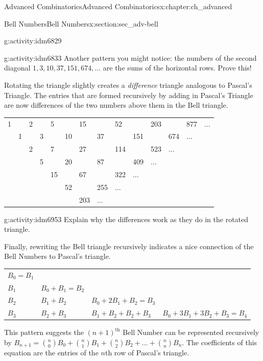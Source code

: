 \documentclass[oneside,10pt,]{book}
\numberwithin{equation}{chapter}
\begin{document}
\begin{chapterptx}{Advanced Combinatorics}{}{Advanced Combinatorics}{}{}{x:chapter:ch_advanced}
\begin{sectionptx}{Bell Numbers}{}{Bell Numbers}{}{}{x:section:sec_adv-bell}
\begin{activity}{}{g:activity:idm6829}
\end{activity}
\begin{activity}{}{g:activity:idm6833}%
Another pattern you might notice: the numbers of the second diagonal \(1, 3, 10, 37, 151, 674, \ldots\) are the sums of the horizontal rows.  Prove this!%
\end{activity}
Rotating the triangle slightly creates a \emph{difference} triangle analogous to Pascal's Triangle. The entries that are formed recursively by adding in Pascal's Triangle are now differences of the two numbers above them in the Bell triangle.%
\begin{sidebyside}{1}{0}{0}{0}%
\begin{sbspanel}{1}%
{\centering%
\begin{tabular}{llllllllllllll}
1&&2&&5&&15&&52&&203&&877&\(\ldots\)\tabularnewline[0pt]
&1&&3&&10&&37&&151&&674&\(\ldots\)&\tabularnewline[0pt]
&&2&&7&&27&&114&&523&\(\ldots\)&&\tabularnewline[0pt]
&&&5&&20&&87&&409&\(\ldots\)&&&\tabularnewline[0pt]
&&&&15&&67&&322&\(\ldots\)&&&&\tabularnewline[0pt]
&&&&&52&&255&\(\ldots\)&&&&&\tabularnewline[0pt]
&&&&&&203&\(\ldots\)&&&&&&
\end{tabular}
\par}
\end{sbspanel}%
\end{sidebyside}%
\begin{activity}{}{g:activity:idm6953}%
Explain why the differences work as they do in the rotated triangle.%
\end{activity}
Finally, rewriting the Bell triangle recursively indicates a nice connection of the Bell Numbers to Pascal's triangle.%
\begin{sidebyside}{1}{0}{0}{0}%
\begin{sbspanel}{1}%
{\centering%
\begin{tabular}{llll}
\(B_{0} = B_{1}\)&&&\tabularnewline[0pt]
\(B_{1}\)&\(B_{0} + B_{1} = B_{2}\)&&\tabularnewline[0pt]
\(B_{2}\)&\(B_{1} + B_{2}\)&\(B_{0} + 2B_{1} + B_{2} = B_{3}\)&\tabularnewline[0pt]
\(B_{3}\)&\(B_{2} + B_{3}\)&\(B_{1} + B_{2} + B_{2} + B_{3}\)&\(B_{0} + 3B_{1} + 3B_{2} + B_{3} = B_{4}\)
\end{tabular}
\par}
\end{sbspanel}%
\end{sidebyside}%
\par
This pattern suggests the \({(n + 1)}^{\text{th}}\) Bell Number can be represented recursively by \(B_{n + 1} = \binom{n}{0} B_{0} + \binom{n}{1} B_{1} + \binom{n}{2}B_{2} + \ldots + \binom{n}{n} B_{n}\). The coefficients of this equation are the entries of the \(n\)th row of Pascal's triangle.%

\end{sectionptx}
\end{chapterptx}
\end{document}
